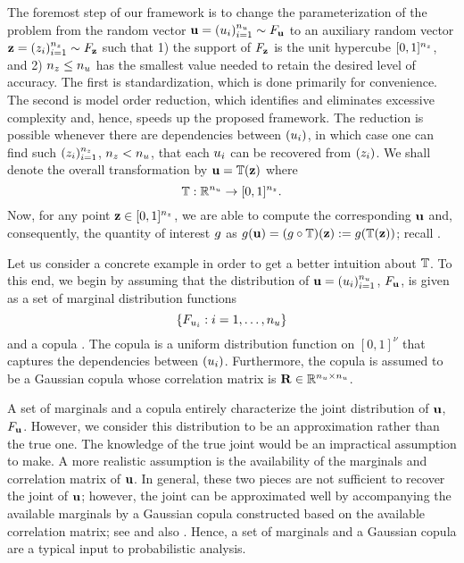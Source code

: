 The foremost step of our framework is to change the parameterization of the
problem from the random vector $\mathbf{u} = (u_i)_{i = 1}^{n_u} \sim F_{\mathbf{u}}$
to an auxiliary random vector $\mathbf{z} = (z_i)_{i = 1}^{n_z} \sim F_{\mathbf{z}}$
such that 1) the support of $F_{\mathbf{z}}$ is the unit hypercube $[0,
1]^{n_z}$, and 2) ${n_z} \leq {n_u}$ has the smallest value needed to retain the
desired level of accuracy. The first is standardization, which is done primarily
for convenience. The second is model order reduction, which identifies and
eliminates excessive complexity and, hence, speeds up the proposed framework.
The reduction is possible whenever there are dependencies between $(u_i)$, in
which case one can find such $(z_i)_{i = 1}^{n_z}$, ${n_z} < {n_u}$, that each $u_i$
can be recovered from $(z_i)$. We shall denote the overall transformation by
$\mathbf{u} = \mathbb{T}(\mathbf{z})$ where
\begin{equation} \elab{transformation}
  \transformation: \real^\nu \to [0, 1]^\nz.
\end{equation}
Now, for any point $\mathbf{z} \in [0, 1]^{n_z}$, we are able to compute the
corresponding $\mathbf{u}$ and, consequently, the quantity of interest $g$ as $g(\mathbf{u})
= (g \circ \mathbb{T})(\mathbf{z}) := g(\mathbb{T}(\mathbf{z}))$; recall
.

Let us consider a concrete example in order to get a better intuition about
$\mathbb{T}$. To this end, we begin by assuming that the distribution of
$\mathbf{u} = (u_i)_{i = 1}^{n_u}$, $F_{\mathbf{u}}$, is given as a set of marginal
distribution functions
\[
  \{ F_{u_i}: i = 1, \dots, {n_u} \}
\]
and a copula \cite{nelsen2006}. The copula is a uniform distribution function on
$[0, 1]^\nu$ that captures the dependencies between $(u_i)$. Furthermore, the
copula is assumed to be a Gaussian copula whose correlation matrix is
$\mathbf{R} \in \mathbb{R}^{{n_u} \times {n_u}}$.

\begin{remark}
A set of marginals and a copula entirely characterize the joint distribution of
$\mathbf{u}$, $F_{\mathbf{u}}$. However, we consider this distribution to be an
approximation rather than the true one. The knowledge of the true joint would be
an impractical assumption to make. A more realistic assumption is the
availability of the marginals and correlation matrix of $\mathbf{u}$. In general, these
two pieces are not sufficient to recover the joint of $\mathbf{u}$; however, the joint
can be approximated well by accompanying the available marginals by a Gaussian
copula constructed based on the available correlation matrix; see \cite{liu1986}
and also \cite{ukhov2014}. Hence, a set of marginals and a Gaussian copula are
a typical input to probabilistic analysis.
\end{remark}

